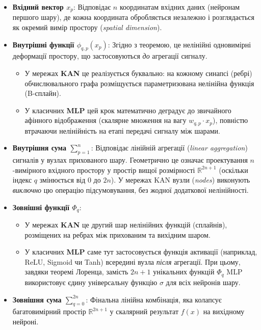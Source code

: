 \documentclass[12pt,a4paper]{article}
\begin{document}
	\begin{itemize}
		\item \textbf{Вхідний вектор $x_p$}: Відповідає $n$ координатам вхідних даних (нейронам першого шару), де кожна координата обробляється незалежно і розглядається як окремий вимір простору (\textit{spatial dimension}).
		
		\item \textbf{Внутрішні функції $\phi_{q,p}(x_p)$}: Згідно з теоремою, це нелінійні одновимірні деформації простору, що застосовуються \textit{до} агрегації сигналу.
		\begin{itemize}
			\item У мережах \textbf{KAN} це реалізується буквально: на кожному синапсі (ребрі) обчислювального графа розміщується параметризована нелінійна функція (B-сплайн).
			\item У класичних \textbf{MLP} цей крок математично деградує до звичайного афінного відображення (скалярне множення на вагу $w_{q,p} \cdot x_p$), повністю втрачаючи нелінійність на етапі передачі сигналу між шарами.
		\end{itemize}
		
		\item \textbf{Внутрішня сума $\sum_{p=1}^n$}: Відповідає лінійній агрегації (\textit{linear aggregation}) сигналів у вузлах прихованого шару. Геометрично це означає проектування $n$-вимірного вхідного простору у простір вищої розмірності $\mathbb{R}^{2n+1}$ (оскільки індекс $q$ змінюється від $0$ до $2n$). У мережах KAN вузли (\textit{nodes}) виконують \textit{виключно} цю операцію підсумовування, без жодної додаткової нелінійності.
		
		\item \textbf{Зовнішні функції $\Phi_q$}: 
		\begin{itemize}
			\item У мережах \textbf{KAN} це другий шар нелінійних функцій (сплайнів), розміщених на ребрах між прихованим та вихідним шаром.
			\item У класичних \textbf{MLP} саме тут застосовується функція активації (наприклад, ReLU, Sigmoid чи Tanh) всередині вузла \textit{після} агрегації. При цьому, завдяки теоремі Лоренца, замість $2n+1$ унікальних функцій $\Phi_q$ MLP використовує єдину універсальну функцію $\sigma$ для всіх нейронів шару.
		\end{itemize}
		
		\item \textbf{Зовнішня сума $\sum_{q=0}^{2n}$}: Фінальна лінійна комбінація, яка колапсує багатовимірний простір $\mathbb{R}^{2n+1}$ у скалярний результат $f(x)$ на вихідному нейроні.
	\end{itemize}
	
\end{document}
